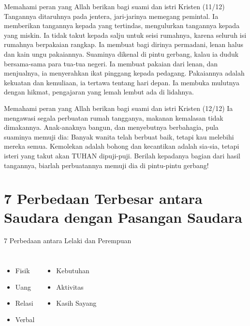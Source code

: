 \documentclass{beamer}
\theoremstyle{mystyle}
\begin{document}
\begin{frame}{Memahami peran yang Allah berikan bagi suami dan istri Kristen (11/12)}
Tangannya ditaruhnya pada jentera, jari-jarinya memegang pemintal. Ia memberikan tangannya kepada yang tertindas, mengulurkan tangannya kepada yang miskin. Ia tidak takut kepada salju untuk seisi rumahnya, karena seluruh isi rumahnya berpakaian rangkap. Ia membuat bagi dirinya permadani, lenan halus dan kain ungu pakaiannya. Suaminya dikenal di pintu gerbang, kalau ia duduk bersama-sama para tua-tua negeri. Ia membuat pakaian dari lenan, dan menjualnya, ia menyerahkan ikat pinggang kepada pedagang. Pakaiannya adalah kekuatan dan kemuliaan, ia tertawa tentang hari depan. Ia membuka mulutnya dengan hikmat, pengajaran yang lemah lembut ada di lidahnya. 
\end{frame}

\begin{frame}{Memahami peran yang Allah berikan bagi suami dan istri Kristen (12/12)}
Ia mengawasi segala perbuatan rumah tangganya, makanan kemalasan tidak dimakannya. Anak-anaknya bangun, dan menyebutnya berbahagia, pula suaminya memuji dia: Banyak wanita telah berbuat baik, tetapi kau melebihi mereka semua. Kemolekan adalah bohong dan kecantikan adalah sia-sia, tetapi isteri yang takut akan TUHAN dipuji-puji. Berilah kepadanya bagian dari hasil tangannya, biarlah perbuatannya memuji dia di pintu-pintu gerbang!  				
\end{frame}

\section{7 Perbedaan Terbesar antara Saudara dengan Pasangan Saudara}
\begin{frame}{7 Perbedaan antara Lelaki dan Perempuan}
	\begin{columns}[c]		
		\column{1.5in}
		\begin{itemize}
			\item<2-> Fisik
			\hfill \break
			\item<3-> Uang
			\hfill \break
			\item<4-> Relasi
			\hfill \break
			\item<5-> Verbal
		\end{itemize}		
		\column{2.5in}
		\begin{itemize}
			\item<6-> Kebutuhan 
			\hfill \break
			\item<7-> Aktivitas
			\hfill \break
			\item<8-> Kasih Sayang
		\end{itemize}				
	\end{columns}
\end{frame}
\end{document}
